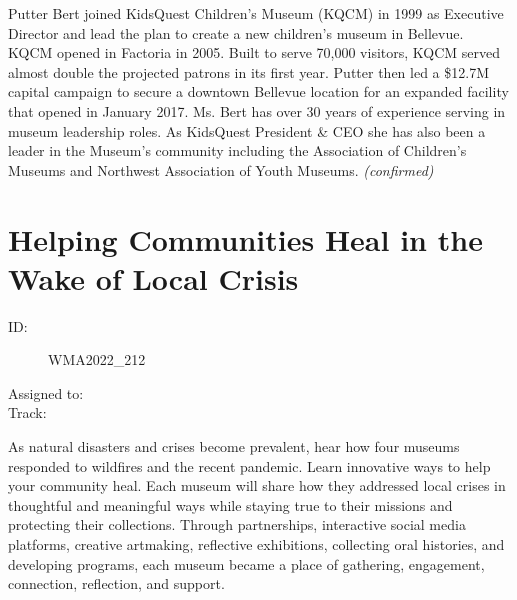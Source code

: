 \documentclass{report}
\begin{document}
                Putter Bert joined KidsQuest Children’s Museum (KQCM) in 1999 as Executive Director and lead the plan to create a new children’s museum in Bellevue. KQCM opened in Factoria in 2005. Built to serve 70,000 visitors, KQCM served almost double the projected patrons in its first year. Putter then led a \$12.7M capital campaign to secure a downtown Bellevue location for an expanded facility that opened in January 2017. Ms. Bert has over 30 years of experience serving in museum leadership roles. As KidsQuest President \& CEO she has also been a leader in the Museum’s community including the Association of Children’s Museums and Northwest Association of Youth Museums.
                \emph{ (confirmed) }
              

              

              

              
        
          \newpage
          \section{ Helping Communities Heal in the Wake of Local Crisis }
            \begin{description}
              \item [ID:]
              WMA2022\_212

              \item [Assigned to:]
                \item [Track:]
              \end{description}

              As natural disasters and crises become prevalent, hear how four museums responded to wildfires and the recent pandemic. Learn innovative ways to help your community heal. Each museum will share how they addressed local crises in thoughtful and meaningful ways while staying true to their missions and protecting their collections. Through partnerships, interactive social media platforms, creative artmaking, reflective exhibitions, collecting oral histories, and developing programs, each museum became a place of gathering, engagement, connection, reflection, and support.
\end{document}
